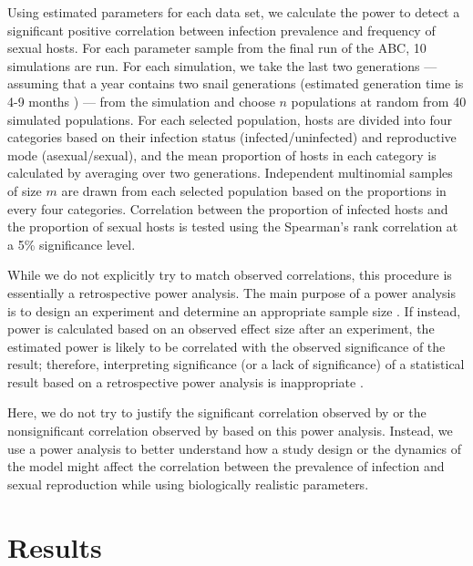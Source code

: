 \documentclass{article}\usepackage[]{graphicx}\usepackage[]{color}
\begin{document}
Using estimated parameters for each data set, we calculate the power to detect a significant positive correlation between infection prevalence and frequency of sexual hosts.
For each parameter sample from the final run of the ABC, 10 simulations are run.
For each simulation, we take the last two generations --- assuming that a year contains two snail generations (estimated generation time is 4-9 months \citep{neiman2005variation}) --- from the simulation and choose $n$ populations at random from 40 simulated populations.
For each selected population, hosts are divided into four categories based on their infection status (infected/uninfected) and reproductive mode (asexual/sexual),
and the mean proportion of hosts in each category is calculated by averaging over two generations.
Independent multinomial samples of size $m$ are drawn from each selected population based on the proportions in every four categories. 
Correlation between the proportion of infected hosts and the proportion of sexual hosts is tested using the Spearman's rank correlation at a 5\% significance level.

While we do not explicitly try to match observed correlations, this procedure is essentially a retrospective power analysis.
The main purpose of a power analysis is to design an experiment and determine an appropriate sample size \citep{cohen1992statistical}.
If instead, power is calculated based on an observed effect size after an experiment, the estimated power is likely to be correlated with the observed significance of the result;
therefore, interpreting significance (or a lack of significance) of a statistical result based on a retrospective power analysis is inappropriate \citep{goodman1994use, senn2002power}.

Here, we do not try to justify the significant correlation observed by \citep{mckone2016fine} or the nonsignificant correlation observed by \citep{dagan2013clonal} based on this power analysis. 
Instead, we use a power analysis to better understand how a study design or the dynamics of the model might affect the correlation between the prevalence of infection and sexual reproduction while using biologically realistic parameters.

\section{Results}
\end{document}
